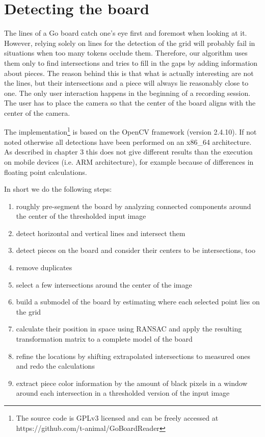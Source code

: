
\chapter{Detecting the board}
	\label{detector}
	The lines of a Go board catch one's eye first and foremost when looking at it. However, relying solely on lines for the detection of the grid will probably fail in situations when too many tokens occlude them. Therefore, our algorithm uses them only to find intersections and tries to fill in the gaps by adding information about pieces. The reason behind this is that what is actually interesting are not the lines, but their intersections and a piece will always lie reasonably close to one. The only user interaction happens in the beginning of a recording session. The user has to place the camera so that the center of the board aligns with the center of the camera.

	The implementation\footnote{The source code is GPLv3 licensed and can be freely accessed at https://github.com/t-animal/GoBoardReader} is based on the OpenCV framework (version 2.4.10). If not noted otherwise all detections have been performed on an x86\_64 architecture. As described in chapter 3 this does not give different results than the execution on mobile devices (i.e. ARM architecture), for example because of differences in floating point calculations.

	In short we do the following steps:
	\begin{enumerate}
		\item roughly pre-segment the board by analyzing connected components around the center of the thresholded input image
		\item detect horizontal and vertical lines and intersect them
		\item detect pieces on the board and consider their centers to be intersections, too
		\item remove duplicates
		\item select a few intersections around the center of the image
		\item build a submodel of the board by estimating where each selected point lies on the grid
		\item calculate their position in space using RANSAC and apply the resulting transformation matrix to a complete model of the board
		\item refine the locations by shifting extrapolated intersections to measured ones and redo the calculations
		\item extract piece color information by the amount of black pixels in a window around each intersection in a thresholded version of the input image
	\end{enumerate}

